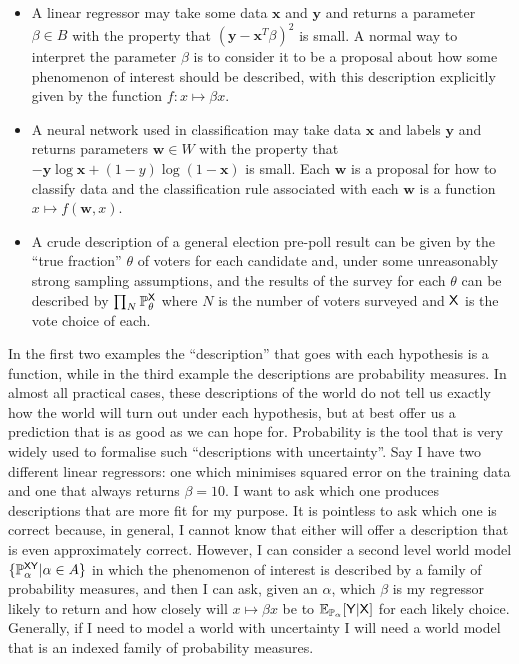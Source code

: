 \begin{itemize}
    \item A linear regressor may take some data $\mathbf{x}$ and $\mathbf{y}$ and returns a parameter $\beta\in B$ with the property that $(\mathbf{y}-\mathbf{x}^T \beta)^2$ is small. A normal way to interpret the parameter $\beta$ is to consider it to be a proposal about how some phenomenon of interest should be described, with this description explicitly given by the function $f:x\mapsto \beta x$.
    \item A neural network used in classification may take data $\mathbf{x}$ and labels $\mathbf{y}$ and returns parameters $\mathbf{w}\in W$ with the property that $-\mathbf{y} \log \mathbf{x}+(1-y)\log(1-\mathbf{x})$ is small. Each $\mathbf{w}$ is a proposal for how to classify data and the classification rule associated with each $\mathbf{w}$ is a function $x\mapsto f(\mathbf{w},x)$.
    \item A crude description of a general election pre-poll result can be given by the ``true fraction'' $\theta$ of voters for each candidate and, under some unreasonably strong sampling assumptions, and the results of the survey for each $\theta$ can be described by $\prod_N\mathbb{P}_\theta^{\mathsf{X}}$ where $N$ is the number of voters surveyed and $\mathsf{X}$ is the vote choice of each.
\end{itemize}

In the first two examples the ``description'' that goes with each hypothesis is a function, while in the third example the descriptions are probability measures. In almost all practical cases, these descriptions of the world do not tell us exactly how the world will turn out under each hypothesis, but at best offer us a prediction that is as good as we can hope for. Probability is the tool that is very widely used to formalise such ``descriptions with uncertainty''. Say I have two different linear regressors: one which minimises squared error on the training data and one that always returns $\beta=10$. I want to ask which one produces descriptions that are more fit for my purpose. It is pointless to ask which one is correct because, in general, I cannot know that either will offer a description that is even approximately correct. However, I can consider a second level world model $\{\mathbb{P}^{\mathsf{X}\mathsf{Y}}_\alpha|\alpha\in A\}$ in which the phenomenon of interest is described by a family of probability measures, and then I can ask, given an $\alpha$, which $\beta$ is my regressor likely to return and how closely will $x\mapsto \beta x$ be to $\mathbb{E}_{\mathbb{P}_\alpha}[\mathsf{Y}|\mathsf{X}]$ for each likely choice. Generally, if I need to model a world with uncertainty I will need a world model that is an indexed family of probability measures.


